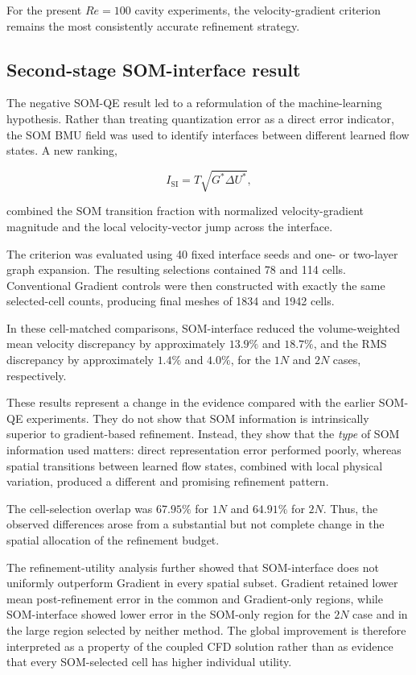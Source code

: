 For the present \(Re=100\) cavity experiments, the velocity-gradient
criterion remains the most consistently accurate refinement strategy.


\subsection{Second-stage SOM-interface result}

The negative SOM-QE result led to a reformulation of the machine-learning
hypothesis. Rather than treating quantization error as a direct error
indicator, the SOM BMU field was used to identify interfaces between
different learned flow states. A new ranking,

\begin{equation}
I_{\mathrm{SI}}
=
T\sqrt{G^*\Delta U^*},
\end{equation}

combined the SOM transition fraction with normalized velocity-gradient
magnitude and the local velocity-vector jump across the interface.

The criterion was evaluated using 40 fixed interface seeds and one- or
two-layer graph expansion. The resulting selections contained 78 and 114
cells. Conventional Gradient controls were then constructed with exactly
the same selected-cell counts, producing final meshes of 1834 and 1942
cells.

In these cell-matched comparisons, SOM-interface reduced the volume-weighted
mean velocity discrepancy by approximately \(13.9\%\) and \(18.7\%\), and
the RMS discrepancy by approximately \(1.4\%\) and \(4.0\%\), for the \(1N\)
and \(2N\) cases, respectively.

These results represent a change in the evidence compared with the earlier
SOM-QE experiments. They do not show that SOM information is intrinsically
superior to gradient-based refinement. Instead, they show that the
\emph{type} of SOM information used matters: direct representation error
performed poorly, whereas spatial transitions between learned flow states,
combined with local physical variation, produced a different and promising
refinement pattern.

The cell-selection overlap was \(67.95\%\) for \(1N\) and \(64.91\%\) for
\(2N\). Thus, the observed differences arose from a substantial but not
complete change in the spatial allocation of the refinement budget.

The refinement-utility analysis further showed that SOM-interface does not
uniformly outperform Gradient in every spatial subset. Gradient retained
lower mean post-refinement error in the common and Gradient-only regions,
while SOM-interface showed lower error in the SOM-only region for the
\(2N\) case and in the large region selected by neither method. The global
improvement is therefore interpreted as a property of the coupled CFD
solution rather than as evidence that every SOM-selected cell has higher
individual utility.


